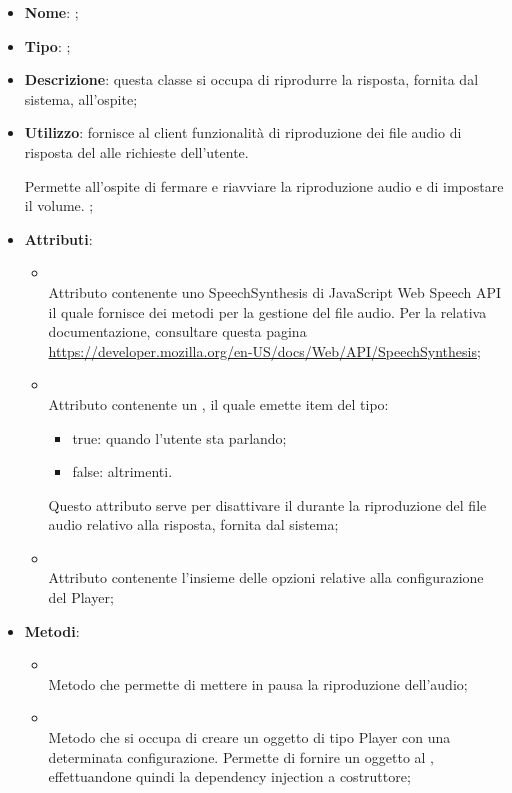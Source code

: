 \begin{itemize}
	\item \textbf{Nome}: ;
	\item \textbf{Tipo}: ;
	\item \textbf{Descrizione}: questa classe si occupa di riprodurre la risposta, fornita dal sistema, all'ospite;
	\item \textbf{Utilizzo}: fornisce al client funzionalità di riproduzione dei file audio di risposta del  alle richieste dell'utente.

Permette all'ospite di fermare e riavviare la riproduzione audio e di impostare il volume.
;
	\item \textbf{Attributi}:
	\begin{itemize}
		\item[]  \\
		Attributo contenente uno SpeechSynthesis di JavaScript Web Speech API il quale fornisce dei metodi per la gestione del file audio.
Per la relativa documentazione, consultare questa pagina \url{https://developer.mozilla.org/en-US/docs/Web/API/SpeechSynthesis};
		\item[]  \\
		Attributo contenente un , il quale emette item del tipo:
\begin{itemize}
\item true: quando l'utente sta parlando;
\item false: altrimenti.
\end{itemize}
Questo attributo serve per disattivare il  durante la riproduzione del file audio relativo alla risposta, fornita dal sistema;
		\item[]  \\
		Attributo contenente l'insieme delle opzioni relative alla configurazione del Player;
	\end{itemize}
	\item \textbf{Metodi}:
	\begin{itemize}
		\item[]  \\
		Metodo che permette di mettere in pausa la riproduzione dell'audio;\\
		\item[]  \\
		Metodo che si occupa di creare un oggetto di tipo Player con una determinata configurazione. Permette di fornire un oggetto  al , effettuandone quindi la dependency injection a costruttore;\\

\end{itemize}
\end{itemize}
